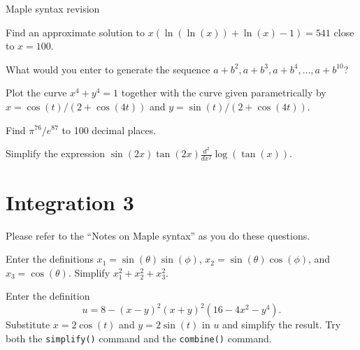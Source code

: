 \documentclass[a4paper,10pt]{amsbook}
\numberwithin{example}{chapter}
\begin{document}
\begin{center}
 {\huge Maple syntax revision}
\end{center}

\begin{exercise}
 Find an approximate solution to
 $x(\ln(\ln(x))+\ln(x)-1)=541$ close to $x=100$. 
\end{exercise}

\begin{exercise}
 What would you enter to generate the sequence
 $a+b^2,a+b^3,a+b^4,\dotsc,a+b^{10}$? 
\end{exercise}


\begin{exercise}
 Plot the curve $x^4+y^4=1$ together with the curve given
 parametrically by $x=\cos(t)/(2+\cos(4t))$ and
 $y=\sin(t)/(2+\cos(4t))$. 
\end{exercise}

\begin{exercise}
 Find $\pi^{76}/e^{87}$ to 100 decimal places.
\end{exercise}

\begin{exercise}
 Simplify the expression
 $\displaystyle \sin(2x)\tan(2x)\frac{d^2}{dx^2}\log(\tan(x))$.
\end{exercise}


\chapter{Integration 3}

Please refer to the ``Notes on Maple syntax'' as you do
these questions.

\begin{exercise}
 Enter the definitions $x_1=\sin(\theta)\sin(\phi)$,
 $x_2=\sin(\theta)\cos(\phi)$, and $x_3=\cos(\theta)$.
 Simplify $x_1^2+x_2^2+x_3^2$.
\end{exercise}

\begin{exercise}
 Enter the definition
 \[ u = 8 - (x-y)^2 (x+y)^2 (16 - 4x^2 - y^4). \]
 Substitute $x=2\cos(t)$ and $y=2\sin(t)$ in $u$ and
 simplify the result.  Try both the \verb~simplify()~
 command and the \verb~combine()~ command.
\end{exercise}
\end{document}
